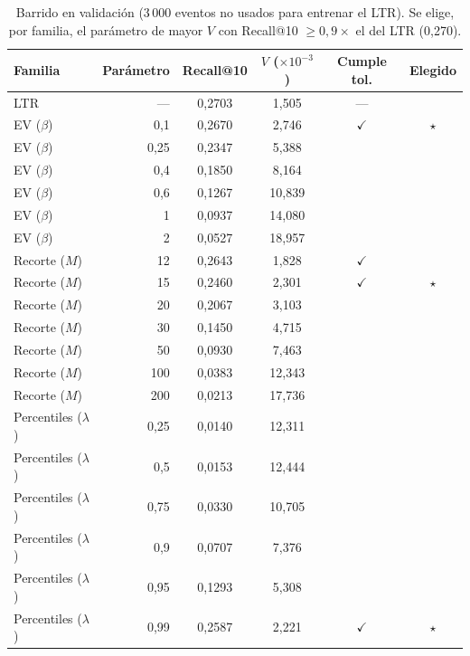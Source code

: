 \begin{table}[ht]
\centering
\footnotesize
\caption{Barrido en validación (3\,000 eventos no usados para entrenar el LTR). Se elige, por familia, el parámetro de mayor $V$ con Recall@10 $\geq 0{,}9\times$ el del LTR (0{,}270).}
\label{tab:anexo_activo_seleccion}
\begin{tabular}{@{}l r cc cc@{}}
\toprule
\textbf{Familia} & \textbf{Parámetro} & \textbf{Recall@10} & \textbf{$V$ ($\times10^{-3}$)} & \textbf{Cumple tol.} & \textbf{Elegido} \\ \midrule
LTR & --- & 0{,}2703 & 1{,}505 & --- &  \\
\midrule
EV ($\beta$) & 0{,}1 & 0{,}2670 & 2{,}746 & $\checkmark$ & $\star$ \\
EV ($\beta$) & 0{,}25 & 0{,}2347 & 5{,}388 &  &  \\
EV ($\beta$) & 0{,}4 & 0{,}1850 & 8{,}164 &  &  \\
EV ($\beta$) & 0{,}6 & 0{,}1267 & 10{,}839 &  &  \\
EV ($\beta$) & 1 & 0{,}0937 & 14{,}080 &  &  \\
EV ($\beta$) & 2 & 0{,}0527 & 18{,}957 &  &  \\
\midrule
Recorte ($M$) & 12 & 0{,}2643 & 1{,}828 & $\checkmark$ &  \\
Recorte ($M$) & 15 & 0{,}2460 & 2{,}301 & $\checkmark$ & $\star$ \\
Recorte ($M$) & 20 & 0{,}2067 & 3{,}103 &  &  \\
Recorte ($M$) & 30 & 0{,}1450 & 4{,}715 &  &  \\
Recorte ($M$) & 50 & 0{,}0930 & 7{,}463 &  &  \\
Recorte ($M$) & 100 & 0{,}0383 & 12{,}343 &  &  \\
Recorte ($M$) & 200 & 0{,}0213 & 17{,}736 &  &  \\
\midrule
Percentiles ($\lambda$) & 0{,}25 & 0{,}0140 & 12{,}311 &  &  \\
Percentiles ($\lambda$) & 0{,}5 & 0{,}0153 & 12{,}444 &  &  \\
Percentiles ($\lambda$) & 0{,}75 & 0{,}0330 & 10{,}705 &  &  \\
Percentiles ($\lambda$) & 0{,}9 & 0{,}0707 & 7{,}376 &  &  \\
Percentiles ($\lambda$) & 0{,}95 & 0{,}1293 & 5{,}308 &  &  \\
Percentiles ($\lambda$) & 0{,}99 & 0{,}2587 & 2{,}221 & $\checkmark$ & $\star$ \\
\bottomrule
\end{tabular}
\end{table}
